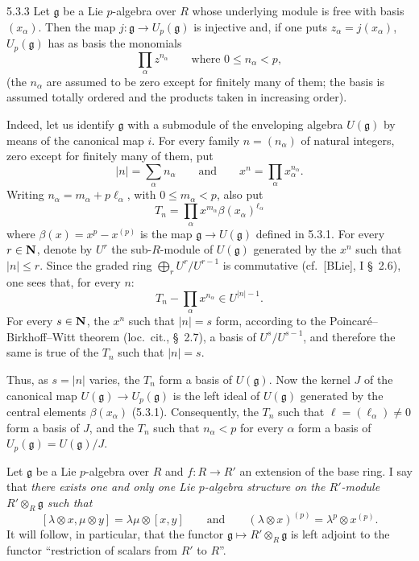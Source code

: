 \begin{proposition}{5.3.3}\label{VIIA.5.3.3}
Let $\mathfrak g$ be a Lie $p$-algebra over $R$ whose underlying module is free with basis $(x_\alpha)$. Then the map $j:\mathfrak g\to U_p(\mathfrak g)$ is injective and, if one puts $z_\alpha=j(x_\alpha)$, $U_p(\mathfrak g)$ has as basis the monomials
\[
\prod_\alpha z^{n_\alpha}\qquad\text{where }0\leq n_\alpha<p,
\]
(the $n_\alpha$ are assumed to be zero except for finitely many of them; the basis is assumed totally ordered and the products taken in increasing order).
\end{proposition}
Indeed, let us identify $\mathfrak g$ with a submodule of the enveloping algebra $U(\mathfrak g)$ by means of the canonical map $i$. For every family $n=(n_\alpha)$ of natural integers, zero except for finitely many of them, put
\[
|n|=\sum_\alpha n_\alpha\qquad\text{and}\qquad x^n=\prod_\alpha x_\alpha^{n_\alpha}.
\]
Writing $n_\alpha=m_\alpha+p\ell_\alpha$, with $0\leq m_\alpha<p$, also put
\[
T_n=\prod_\alpha x^{m_\alpha}\beta(x_\alpha)^{\ell_\alpha}
\]
where $\beta(x)=x^p-x^{(p)}$ is the map $\mathfrak g\to U(\mathfrak g)$ defined in 5.3.1.
For every $r\in\mathbf{N}$, denote by $U^r$ the sub-$R$-module of $U(\mathfrak g)$ generated by the $x^n$ such that $|n|\leq r$. Since the graded ring $\bigoplus_r U^r/U^{r-1}$ is commutative (cf.\ [BLie], I \S~2.6), one sees that, for every $n$:
\[
T_n-\prod_\alpha x^{n_\alpha}\in U^{|n|-1}.
\]
For every $s\in\mathbf{N}$, the $x^n$ such that $|n|=s$ form, according to the Poincar\'e--Birkhoff--Witt theorem (loc.\ cit., \S~2.7), a basis of $U^s/U^{s-1}$, and therefore the same is true of the $T_n$ such that $|n|=s$.

Thus, as $s=|n|$ varies, the $T_n$ form a basis of $U(\mathfrak g)$. Now the kernel $J$ of the canonical map $U(\mathfrak g)\to U_p(\mathfrak g)$ is the left ideal of $U(\mathfrak g)$ generated by the central elements $\beta(x_\alpha)$ (5.3.1). Consequently, the $T_n$ such that $\ell=(\ell_\alpha)\ne0$ form a basis of $J$, and the $T_n$ such that $n_\alpha<p$ for every $\alpha$ form a basis of $U_p(\mathfrak g)=U(\mathfrak g)/J$.

Let $\mathfrak g$ be a Lie $p$-algebra over $R$ and $f:R\to R'$ an extension of the base ring. I say that \emph{there exists one and only one Lie $p$-algebra structure on the $R'$-module $R'\otimes_R\mathfrak g$ such that}
\begin{equation}\tag{$*$}
[\lambda\otimes x,\mu\otimes y]=\lambda\mu\otimes[x,y]\qquad\text{and}\qquad(\lambda\otimes x)^{(p)}=\lambda^p\otimes x^{(p)}.
\end{equation}
It will follow, in particular, that the functor $\mathfrak g\mapsto R'\otimes_R\mathfrak g$ is left adjoint to the functor ``restriction of scalars from $R'$ to $R$''.

